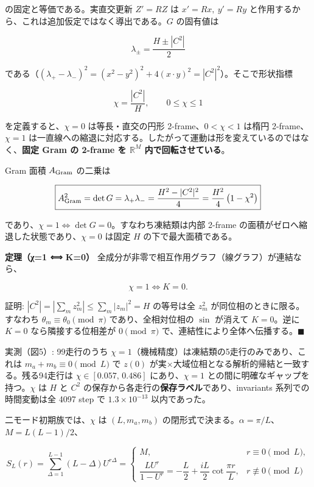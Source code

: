\documentclass[
  a4paper,
]{ltjsarticle}
\begin{document}
の固定と等価である。実直交更新 \(Z'=RZ\) は \(x'=Rx,\ y'=Ry\)
と作用するから、これは追加仮定ではなく導出である。\(G\) の固有値は

\[
\boxed{\lambda_\pm=\frac{H\pm|C^2|}{2}}
\]

である（\((\lambda_+-\lambda_-)^2=(x^2-y^2)^2+4(x\cdot y)^2=|C^2|^2\)）。そこで形状指標

\[
\boxed{\chi=\frac{|C^2|}{H}},
\qquad
0\le\chi\le1
\]

を定義すると、\(\chi=0\) は等長・直交の円形 2-frame、\(0<\chi<1\) は楕円
2-frame、\(\chi=1\)
は一直線への縮退に対応する。したがって運動は形を変えているのではなく、\textbf{固定
Gram の 2-frame を \(\mathbb R^M\) 内で回転させている}。

Gram 面積 \(A_{\rm Gram}\) の二乗は

\[
\boxed{
A_{\rm Gram}^2=\det G=\lambda_+\lambda_-=\frac{H^2-|C^2|^2}{4}=\frac{H^2}{4}\left(1-\chi^2\right)
}
\]

であり、\(\chi=1\iff\det G=0\)。すなわち凍結類は内部 2-frame
の面積がゼロへ縮退した状態であり、\(\chi=0\) は固定 \(H\)
の下で最大面積である。

\textbf{定理（χ=1 ⟺ K=0）}
全成分が非零で相互作用グラフ（線グラフ）が連結なら、

\[
\boxed{\chi=1\iff K=0}.
\]

証明: \(|C^2|=|\sum_m z_m^2|\le\sum_m|z_m|^2=H\) の等号は全 \(z_m^2\)
が同位相のときに限る。すなわち \(\theta_m\equiv\theta_0\pmod\pi\)
であり、全相対位相の \(\sin\) が消えて \(K=0\)。逆に \(K=0\)
なら隣接する位相差が \(0\pmod\pi\)
で、連結性により全体へ伝播する。\(\blacksquare\)

実測（図5）: 99走行のうち
\(\chi=1\)（機械精度）は凍結類の5走行のみであり、これは
\(m_a+m_b\equiv0\pmod L\) で \(z(0)\)
が実×大域位相となる解析的帰結と一致する。残る94走行は
\(\chi\in[0.057,\,0.486]\) にあり、\(\chi=1\)
との間に明確なギャップを持つ。\(\chi\) は \(H\) と \(C^2\)
の保存から各走行の\textbf{保存ラベル}であり、invariants
系列での時間変動は全 4097 step で \(1.3\times10^{-13}\) 以内であった。

二モード初期族では、\(\chi\) は \((L,m_a,m_b)\)
の閉形式で決まる。\(\alpha=\pi/L\)、\(M=L(L-1)/2\)、

\[
S_L(r)=\sum_{\Delta=1}^{L-1}(L-\Delta)U^{r\Delta}
=
\begin{cases}
M, & r\equiv0\pmod L,\\[6pt]
\dfrac{LU^r}{1-U^r}
=-\dfrac L2+\dfrac{iL}{2}\cot\dfrac{\pi r}{L},
& r\not\equiv0\pmod L
\end{cases}
\]
\end{document}
